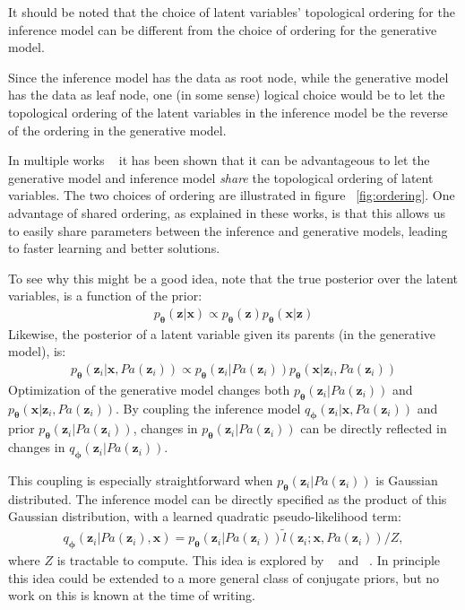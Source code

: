 \documentclass[MAL,biber]{nowfnt} %
\newcommand{\bb}[1]{\mathbf{#1}}
\newcommand{\bx}{\bb{x}}
\newcommand{\bz}{\bb{z}}
\newcommand{\bT}{\boldsymbol{\theta}}
\newcommand{\bphi}{\boldsymbol{\phi}}
\newcommand{\pT}{p_{\bT}}
\newcommand{\qP}{q_{\bphi}}
\begin{document}
It should be noted that the choice of latent variables' topological ordering for the inference model can be different from the choice of ordering for the generative model. 

Since the inference model has the data as root node, while the generative model has the data as leaf node, one (in some sense) logical choice would be to let the topological ordering of the latent variables in the inference model be the reverse of the ordering in the generative model. 

In multiple works ~\citep{salimans2016structured, sonderby2016train, kingma2016improving} it has been shown that it can be advantageous to let the generative model and inference model \emph{share} the topological ordering of latent variables. The two choices of ordering are illustrated in figure ~\ref{fig:ordering}. One advantage of shared ordering, as explained in these works, is that this allows us to easily share parameters between the inference and generative models, leading to faster learning and better solutions.

To see why this might be a good idea, note that the true posterior over the latent variables, is a function of the prior:
\begin{align}
\pT(\bz|\bx) \propto \pT(\bz) \pT(\bx|\bz)
\end{align}
Likewise, the posterior of a latent variable given its parents (in the generative model), is:
\begin{align}
\pT(\bz_i|\bx,Pa(\bz_i)) \propto \pT(\bz_i|Pa(\bz_i)) \pT(\bx|\bz_i,Pa(\bz_i))
\label{eq:pseudolikelihood}
\end{align}
Optimization of the generative model changes both $\pT(\bz_i|Pa(\bz_i))$ and $\pT(\bx|\bz_i,Pa(\bz_i))$. By coupling the inference model $\qP(\bz_i|\bx,Pa(\bz_i))$ and prior $\pT(\bz_i|Pa(\bz_i))$, changes in $\pT(\bz_i|Pa(\bz_i))$ can be directly reflected in changes in $\qP(\bz_i|Pa(\bz_i))$.

This coupling is especially straightforward when $\pT(\bz_i|Pa(\bz_i))$ is Gaussian distributed. The inference model can be directly specified as the product of this Gaussian distribution, with a learned quadratic pseudo-likelihood term: 
\begin{align*}
\qP(\bz_i|Pa(\bz_i),\bx) = \pT(\bz_i|Pa(\bz_i)) \tilde{l}(\bz_i;\bx,Pa(\bz_i)) / Z ,
\end{align*}
where $Z$ is tractable to compute. This idea is explored by ~\citep{salimans2016structured} and ~\citep{sonderby2016train}. In principle this idea could be extended to a more general class of conjugate priors, but no work on this is known at the time of writing.
\end{document}
